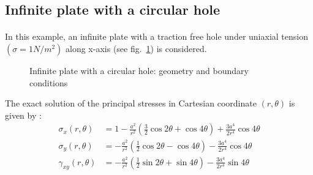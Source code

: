 \subsection{Infinite plate with a circular hole}
\paragraph{}
In this example, an infinite plate with a traction free hole under uniaxial tension $(\sigma = 1 N/m^2 )$
along x-axis (see fig.~\ref{fig:circular_hole_geo_bc}) is considered.

    \begin{figure}[h!]
        \centering
        \caption{ Infinite plate with a circular hole: geometry and boundary conditions}
        \label{fig:circular_hole_geo_bc}
    \end{figure}
    
The exact solution of the principal stresses in Cartesian coordinate $(r,\theta)$ is given by \cite{Sukumar2001}:
    \begin{subequations}
        \begin{align}
            \sigma_{x}(r,\theta) &= 1 - \frac{a^2}{r^2} \left(
                \frac{3}{2} \cos2\theta +
                \cos4\theta
            \right) +
            \frac{3a^4}{2r^4} \cos4\theta\\
            \sigma_{y}(r,\theta) &= -\frac{a^2}{r^2} \left(
                \frac{1}{2} \cos2\theta -
                \cos4\theta
            \right) -
            \frac{3a^4}{2r^4} \cos4\theta\\
            \gamma_{xy}(r,\theta) &= -\frac{a^2}{r^2} \left(
                \frac{1}{2} \sin2\theta +
                \sin4\theta
            \right) -
            \frac{3a^4}{2r^4} \sin4\theta
        \end{align}
    \end{subequations}

